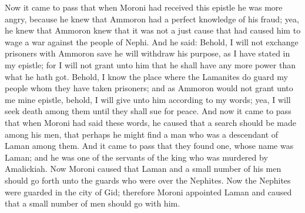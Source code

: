 Now it came to pass that when Moroni had received this epistle he was more angry, because he knew that Ammoron had a perfect knowledge of his fraud; yea, he knew that Ammoron knew that it was not a just cause that had caused him to wage a war against the people of Nephi.
\bverse \iffalse And he said: Behold, I will not exchange prisoners with Ammoron save he will withdraw his purpose, as I have stated in my epistle; for I will not grant unto him that he shall have any more power than what he hath got. \fi
And he said: Behold, I will not exchange prisoners with Ammoron save he will withdraw his purpose, as I have stated in my epistle; for I will not grant unto him that he shall have any more power than what he hath got.
\bverse \iffalse Behold, I know the place where the Lamanites do guard my people whom they have taken prisoners; and as Ammoron would not grant unto me mine epistle, behold, I will give unto him according to my words; yea, I will seek death among them until they shall sue for peace. \fi
Behold, I know the place where the Lamanites do guard my people whom they have taken prisoners; and as Ammoron would not grant unto me mine epistle, behold, I will give unto him according to my words; yea, I will seek death among them until they shall sue for peace.
\bverse \iffalse And now it came to pass that when Moroni had said these words, he caused that a search should be made among his men, that perhaps he might find a man who was a descendant of Laman among them. \fi
And now it came to pass that when Moroni had said these words, he caused that a search should be made among his men, that perhaps he might find a man who was a descendant of Laman among them.
\bverse \iffalse And it came to pass that they found one, whose name was Laman; and he was one of the servants of the king who was murdered by Amalickiah. \fi
And it came to pass that they found one, whose name was Laman; and he was one of the servants of the king who was murdered by Amalickiah.
\bverse \iffalse Now Moroni caused that Laman and a small number of his men should go forth unto the guards who were over the Nephites. \fi
Now Moroni caused that Laman and a small number of his men should go forth unto the guards who were over the Nephites.
\bverse \iffalse Now the Nephites were guarded in the city of Gid; therefore Moroni appointed Laman and caused that a small number of men should go with him. \fi
Now the Nephites were guarded in the city of Gid; therefore Moroni appointed Laman and caused that a small number of men should go with him.
